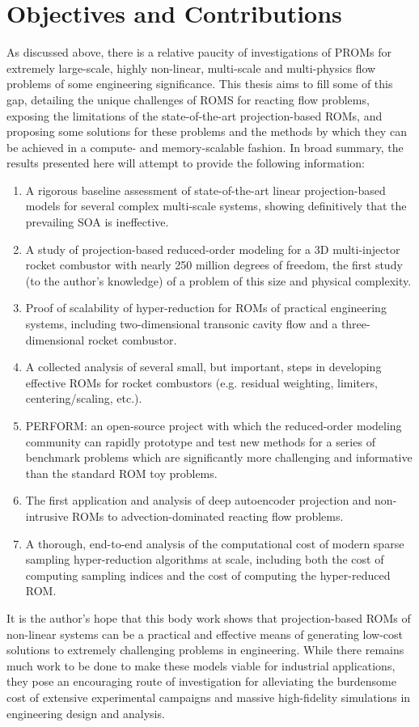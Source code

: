 \section{Objectives and Contributions}

As discussed above, there is a relative paucity of investigations of PROMs for extremely large-scale, highly non-linear, multi-scale and multi-physics flow problems of some engineering significance. This thesis aims to fill some of this gap, detailing the unique challenges of ROMS for reacting flow problems, exposing the limitations of the state-of-the-art projection-based ROMs, and proposing some solutions for these problems and the methods by which they can be achieved in a compute- and memory-scalable fashion. In broad summary, the results presented here will attempt to provide the following information:

\begin{enumerate}
    \item A rigorous baseline assessment of state-of-the-art linear projection-based models for several complex multi-scale systems, showing definitively that the prevailing SOA is ineffective.
    \item A study of projection-based reduced-order modeling for a 3D multi-injector rocket combustor with nearly 250 million degrees of freedom, the first study (to the author's knowledge) of a problem of this size and physical complexity.
    \item Proof of scalability of hyper-reduction for ROMs of practical engineering systems, including two-dimensional transonic cavity flow and a three-dimensional rocket combustor.
    \item A collected analysis of several small, but important, steps in developing effective ROMs for rocket combustors (e.g. residual weighting, limiters, centering/scaling, etc.).
    \item PERFORM: an open-source project with which the reduced-order modeling community can rapidly prototype and test new methods for a series of benchmark problems which are significantly more challenging and informative than the standard ROM toy problems.
    \item The first application and analysis of deep autoencoder projection and non-intrusive ROMs to advection-dominated reacting flow problems.
    \item A thorough, end-to-end analysis of the computational cost of modern sparse sampling hyper-reduction algorithms at scale, including both the cost of computing sampling indices and the cost of computing the hyper-reduced ROM.
\end{enumerate}  

It is the author's hope that this body work shows that projection-based ROMs of non-linear systems can be a practical and effective means of generating low-cost solutions to extremely challenging problems in engineering. While there remains much work to be done to make these models viable for industrial applications, they pose an encouraging route of investigation for alleviating the burdensome cost of extensive experimental campaigns and massive high-fidelity simulations in engineering design and analysis. 